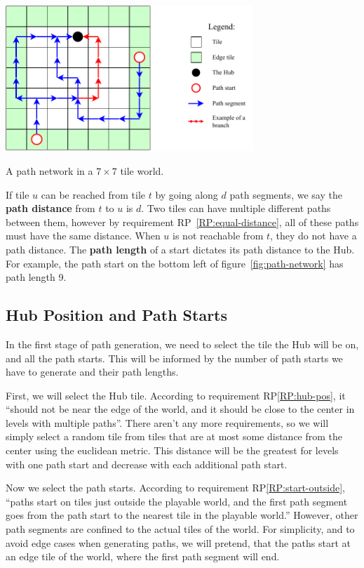 \begin{center}
    \captionsetup{type=figure}
    \includegraphics[width=0.7\textwidth]{img/Example path network.pdf}
    \caption{A path network in a $7\times7$ tile world.}
    \label{fig:path-network}
\end{center}

If tile $u$ can be reached from tile $t$ by going along $d$ path segments, we say the \textbf{path distance} from $t$ to $u$ is $d$.
Two tiles can have multiple different paths between them, however by requirement RP~\ref{RP:equal-distance}, all of these paths must have the same distance.
When $u$ is not reachable from $t$, they do not have a path distance.
The \textbf{path length} of a start dictates its path distance to the Hub.
For example, the path start on the bottom left of figure~\ref{fig:path-network} has path length 9.

\subsection{Hub Position and Path Starts} \label{sec:analysis-path-starts}

In the first stage of path generation, we need to select the tile the Hub will be on, and all the path starts.
This will be informed by the number of path starts we have to generate and their path lengths.

First, we will select the Hub tile.
According to requirement RP\ref{RP:hub-pos}, it \enquote{should not be near the edge of the world, and it should be close to the center in levels with multiple paths}.
There aren't any more requirements, so we will simply select a random tile from tiles that are at most some distance from the center using the euclidean metric.
This distance will be the greatest for levels with one path start and decrease with each additional path start.

Now we select the path starts.
According to requirement RP\ref{RP:start-outside}, \enquote{paths start on tiles just outside the playable world, and the first path segment goes from the path start to the nearest tile in the playable world.}
However, other path segments are confined to the actual tiles of the world.
For simplicity, and to avoid edge cases when generating paths, we will pretend, that the paths start at an edge tile of the world, where the first path segment will end.

